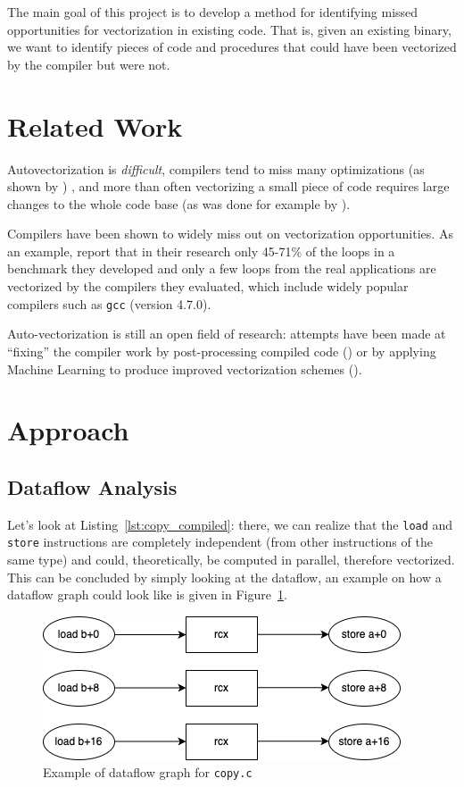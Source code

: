 \documentclass[acmsmall,review, nonacm]{acmart}
\begin{document}


\noindent The main goal of this project is to develop a method for identifying missed opportunities 
for vectorization in existing code. That is, given an existing binary, we want to identify pieces of code
and procedures that could have been vectorized by the compiler but were not.

\section{Related Work}
Autovectorization is \textit{difficult}, compilers tend to miss many optimizations (as shown by \citet{Feng2021})
, and more than often
vectorizing a small piece of code requires large changes to the whole code base 
(as was done for example by \citet{Chen22}).

Compilers have been shown to widely miss out on vectorization opportunities. As an example, \citet{Maleki2021} report that
in their research only 45-71\% of the loops in a benchmark they developed and only a few loops from the real applications 
are vectorized by the compilers they evaluated, which include widely popular compilers such as \texttt{gcc} (version 4.7.0).

Auto-vectorization is still an open field of research: attempts have been made at ``fixing'' the compiler work
by post-processing compiled code (\citet{Porpodas2021}) or by applying Machine Learning to produce improved vectorization schemes
(\citet{Mendis2019}).

\section{Approach}
\subsection{Dataflow Analysis}
Let's look at Listing~\ref{lst:copy_compiled}: there, we can realize that 
the \texttt{load} and \texttt{store} instructions are completely independent (from other instructions of the same type) 
and could, theoretically, be computed in parallel, therefore vectorized. This can be concluded by simply looking at the dataflow,
an example on how a dataflow graph could look like is given in Figure~\ref{fig:dataflow}.

\begin{figure}[h!]
  \includegraphics*[width=0.4\linewidth]{img/dataflow.png}
  \caption{Example of dataflow graph for \texttt{copy.c}}
  \label{fig:dataflow}
\end{figure}
\end{document}
